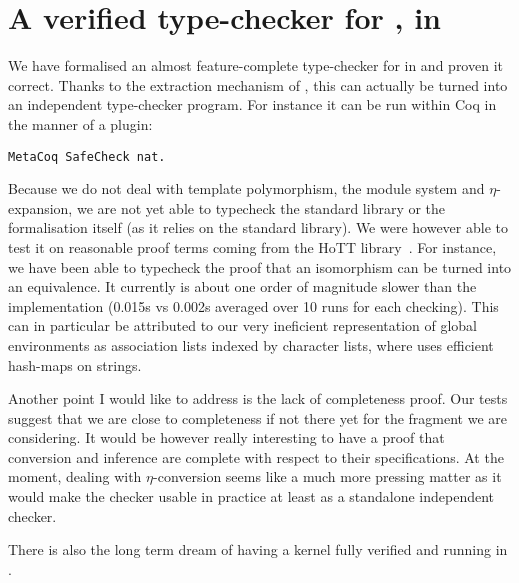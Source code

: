 \section*{A verified type-checker for \Coq, in \Coq}

We have formalised an almost feature-complete type-checker for \Coq in \Coq
and proven it correct. Thanks to the extraction mechanism of \Coq, this can
actually be turned into an independent type-checker program.
For instance it can be run within Coq in the manner of a plugin:
\begin{verbatim}
MetaCoq SafeCheck nat.
\end{verbatim}

Because we do not deal with template polymorphism, the module system and
\(\eta\)-expansion, we are not yet able to typecheck the standard library
or the formalisation itself (as it relies on the standard library).
We were however able to test it on reasonable proof terms coming from
the \acrshort{HoTT} library~.
%
For instance, we have been able to typecheck the proof that an isomorphism can
be turned into an equivalence.
It currently is about one order of magnitude slower than the \Coq
implementation (0.015s vs 0.002s averaged over 10 runs for each checking).
This can in particular be attributed to our very ineficient representation of
global environments as association lists indexed by character lists, where \Coq
uses efficient hash-maps on strings.

Another point I would like to address is the lack of completeness proof.
Our tests suggest that we are close to completeness if not there yet for the
fragment we are considering. It would be however really interesting to have a
proof that conversion and inference are complete with respect to their
specifications.
At the moment, dealing with \(\eta\)-conversion seems like a much more pressing
matter as it would make the checker usable in practice at least as a standalone
independent checker.

There is also the long term dream of having a \Coq kernel fully verified and
running in \Coq.